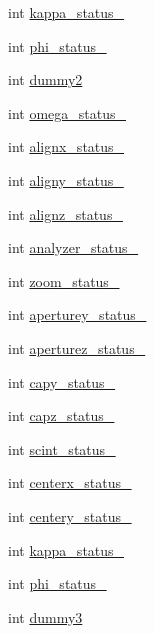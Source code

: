 \begin{DoxyCompactItemize}
\item 
int \hyperlink{structmd2StatusStruct_ab152694bc32d37c1d180f55e8d282020}{kappa\_\-status\_}
\item 
int \hyperlink{structmd2StatusStruct_ad8b8fd90ffff43016e2adaab5ccbfa02}{phi\_\-status\_}
\item 
int \hyperlink{structmd2StatusStruct_a4df936acc498498baba111edb82597a1}{dummy2}
\item 
int \hyperlink{structmd2StatusStruct_a8577c9df7b663b548b2759ac3db721cd}{omega\_\-status\_}
\item 
int \hyperlink{structmd2StatusStruct_a2feb35ceab8129fd2cc34d1104af8b8f}{alignx\_\-status\_}
\item 
int \hyperlink{structmd2StatusStruct_a1f98d8b9831e32d77129f9b0f1d7d255}{aligny\_\-status\_}
\item 
int \hyperlink{structmd2StatusStruct_ac378da16eeaab2bc47f3f8f88f7411ed}{alignz\_\-status\_}
\item 
int \hyperlink{structmd2StatusStruct_a4f88bb778e4e18f1fbf7672ac11e7433}{analyzer\_\-status\_}
\item 
int \hyperlink{structmd2StatusStruct_a34e4200315a083deb8a970e21bbbe277}{zoom\_\-status\_}
\item 
int \hyperlink{structmd2StatusStruct_a0a7738f13a0fa80626cafc2299b104b4}{aperturey\_\-status\_}
\item 
int \hyperlink{structmd2StatusStruct_ae407a99e428d9f4a7444a02c8bc3414e}{aperturez\_\-status\_}
\item 
int \hyperlink{structmd2StatusStruct_a5d7c10d9a16ebcc53ac4a0770ab2ef62}{capy\_\-status\_}
\item 
int \hyperlink{structmd2StatusStruct_a3abb998bb89433aed16121d0dae6275a}{capz\_\-status\_}
\item 
int \hyperlink{structmd2StatusStruct_a4e5bc72e2f4007370f1c29ea272c952f}{scint\_\-status\_}
\item 
int \hyperlink{structmd2StatusStruct_ae4fad6debe138ed7815d463e83f8d0f6}{centerx\_\-status\_}
\item 
int \hyperlink{structmd2StatusStruct_aa242098c185cce8f852cd6e081ef0b1d}{centery\_\-status\_}
\item 
int \hyperlink{structmd2StatusStruct_af6891f5f8dcfc62668f64c583042c6bc}{kappa\_\-status\_}
\item 
int \hyperlink{structmd2StatusStruct_a0e6cea4c32cb34e602b9ac3d21259219}{phi\_\-status\_}
\item 
int \hyperlink{structmd2StatusStruct_adb2dc5bdbf99def51018558201508009}{dummy3}

\end{DoxyCompactItemize}
